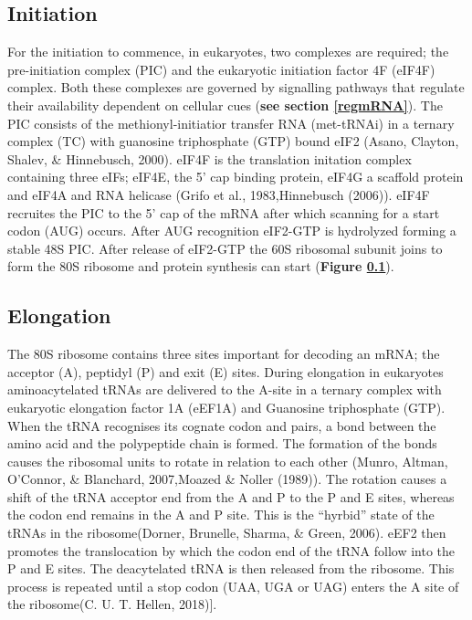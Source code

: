 \documentclass[12pt,openany]{book}
\begin{document}
\clearpage

\subsection{Initiation} \label{initiation}

For the initiation to commence, in eukaryotes, two complexes are
required; the pre-initiation complex (PIC) and the eukaryotic initiation
factor 4F (eIF4F) complex. Both these complexes are governed by
signalling pathways that regulate their availability dependent on
cellular cues (\textbf{see section \ref{regmRNA}}). The PIC consists of
the methionyl-initiatior transfer RNA (met-tRNAi) in a ternary complex
(TC) with guanosine triphosphate (GTP) bound eIF2 (Asano, Clayton,
Shalev, \& Hinnebusch, 2000). eIF4F is the translation initation complex
containing three eIFs; eIF4E, the 5' cap binding protein, eIF4G a
scaffold protein and eIF4A and RNA helicase (Grifo et al.,
1983,Hinnebusch (2006)). eIF4F recruites the PIC to the 5' cap of the
mRNA after which scanning for a start codon (AUG) occurs. After AUG
recognition eIF2-GTP is hydrolyzed forming a stable 48S PIC. After
release of eIF2-GTP the 60S ribosomal subunit joins to form the 80S
ribosome and protein synthesis can start (\textbf{Figure
\ref{initiation}}).

\subsection{Elongation}

The 80S ribosome contains three sites important for decoding an mRNA;
the acceptor (A), peptidyl (P) and exit (E) sites. During elongation in
eukaryotes aminoacytelated tRNAs are delivered to the A-site in a
ternary complex with eukaryotic elongation factor 1A (eEF1A) and
Guanosine triphosphate (GTP). When the tRNA recognises its cognate codon
and pairs, a bond between the amino acid and the polypeptide chain is
formed. The formation of the bonds causes the ribosomal units to rotate
in relation to each other (Munro, Altman, O'Connor, \& Blanchard,
2007,Moazed \& Noller (1989)). The rotation causes a shift of the tRNA
acceptor end from the A and P to the P and E sites, whereas the codon
end remains in the A and P site. This is the ``hyrbid'' state of the
tRNAs in the ribosome(Dorner, Brunelle, Sharma, \& Green, 2006). eEF2
then promotes the translocation by which the codon end of the tRNA
follow into the P and E sites. The deacytelated tRNA is then released
from the ribosome. This process is repeated until a stop codon (UAA, UGA
or UAG) enters the A site of the ribosome(C. U. T. Hellen, 2018){]}.
\end{document}
